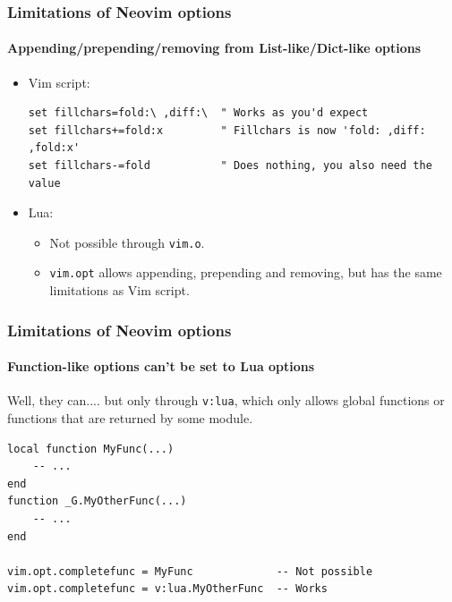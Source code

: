 \documentclass[10pt]{beamer}
\begin{document}
\begin{frame}[fragile]
\frametitle{Limitations of Neovim options}
\framesubtitle{Appending/prepending/removing from List-like/Dict-like options}
\begin{itemize}
    \item Vim script:
\begin{lstlisting}
set fillchars=fold:\ ,diff:\  " Works as you'd expect
set fillchars+=fold:x         " Fillchars is now 'fold: ,diff: ,fold:x'
set fillchars-=fold           " Does nothing, you also need the value
\end{lstlisting}
        \item Lua:
        \begin{itemize}
            \item Not possible through \lstinline{vim.o}.
            \item \lstinline{vim.opt} allows appending, prepending and removing, but has the same
                limitations as Vim script.
        \end{itemize}
\end{itemize}
\end{frame}
\begin{frame}[fragile]
\frametitle{Limitations of Neovim options}
\framesubtitle{Function-like options can't be set to Lua options}
Well, they can.... but only through \lstinline{v:lua}, which only allows global functions or
functions that are returned by some module.
\begin{lstlisting}[style=lua_style]
local function MyFunc(...)
    -- ...
end
function _G.MyOtherFunc(...)
    -- ...
end

vim.opt.completefunc = MyFunc             -- Not possible
vim.opt.completefunc = v:lua.MyOtherFunc  -- Works
\end{lstlisting}
\end{frame}
\end{document}
